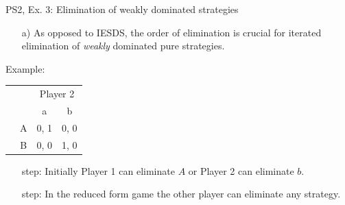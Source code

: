 \begin{frame}{PS2, Ex. 3: Elimination of weakly dominated strategies}
  \begin{itemize}
    \item[a)] As opposed to IESDS, the order of elimination is crucial for iterated elimination of \textit{weakly} dominated pure strategies.
  \end{itemize}
  Example:
  \begin{table}
    \begin{tabular}{cc|c|c|}
        & \multicolumn{1}{c}{} & \multicolumn{2}{c}{Player 2}\\
        \parbox[t]{1mm}{}
        &  &   &  \\
        & A & 0, 1 & 0, 0 \\
        & B & 0, 0 & 1, 0  \\
    \end{tabular}
  \end{table}
  \begin{itemize}
    \item[\nth{1} step:] Initially Player 1 can eliminate $A$ or Player 2 can eliminate $b$.
    \item[\nth{2} step:] In the reduced form game the other player can eliminate any strategy.
  \end{itemize}
\end{frame}
